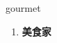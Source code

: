 
\begin{frame}
{\huge gourmet}
\begin{center}
\begin{enumerate}\Large
  \item \textbf{美食家}
\end{enumerate}
\end{center}
\end{frame}
